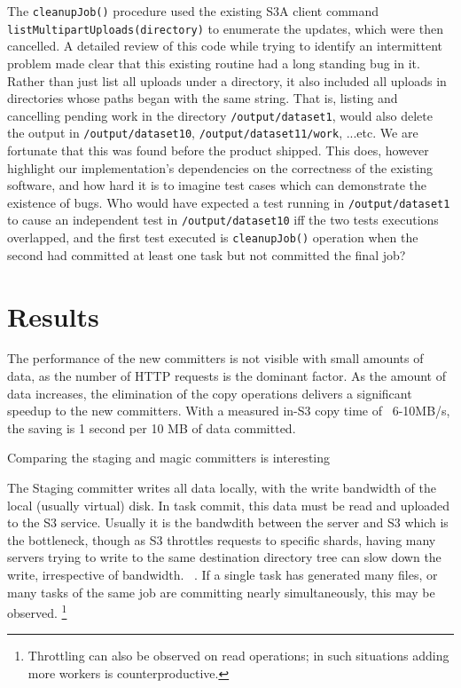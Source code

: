 \documentclass[conference]{IEEEtran}
\begin{document}
The \texttt{cleanupJob()} procedure used the existing S3A client command
\texttt{listMultipartUploads(directory)} to enumerate the updates,
which were then cancelled.
A detailed review of this code while trying to identify an intermittent problem
made clear that this existing routine had a long standing bug in it.
Rather than just list all uploads under a directory, it also included
all uploads in directories whose paths began with the same string.
That is, listing and cancelling pending work in the directory \texttt{/output/dataset1},
would also delete the output in \texttt{/output/dataset10}, \texttt{/output/dataset11/work},
...etc.
We are fortunate that this was found before the product shipped.
This does, however highlight our implementation's dependencies on the correctness
of the existing software, and how hard it is to imagine test cases which
can demonstrate the existence of bugs.
Who would have expected a test running in \texttt{/output/dataset1} to
cause an independent test in \texttt{/output/dataset10} iff the two tests
executions overlapped, and the first test executed is \texttt{cleanupJob()}
operation when the second had committed at least one task but not committed
the final job?



\section{Results}
\label{sec:results}


The performance of the new committers is not visible with small amounts
of data, as the number of HTTP requests is the dominant factor.
As the amount of data increases, the elimination of the copy operations
delivers a significant speedup to the new committers.
With a measured in-S3 copy time of ~6-10MB/s, the saving is 1 second per 10 MB
of data committed.

Comparing the staging and magic committers is interesting

The Staging committer writes all data locally, with the write bandwidth
of the local (usually virtual) disk.
In task commit, this data must be read and uploaded to the S3 service.
Usually it is the bandwdith between the server and S3 which is the bottleneck,
though as S3 throttles requests to specific shards, having many servers trying
to write to the same destination directory tree can slow down the write, irrespective
of bandwidth.
\ \cite{AWS-S3-throttling}.
If a single task has generated many files, or many tasks of the same job are
committing nearly simultaneously, this may be observed.
\footnote{Throttling can also be observed on read operations;
in such situations adding more workers is counterproductive.}
\end{document}
